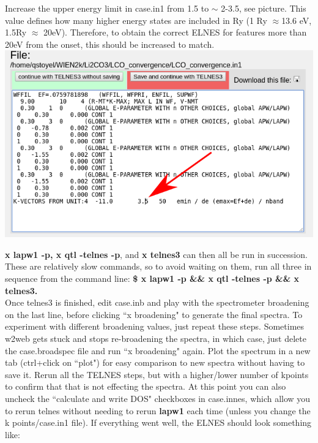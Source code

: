 \documentclass[12pt]{article}
\begin{document}
Increase the upper energy limit in case.in1 from 1.5 to $\sim$ 2-3.5, see picture.  This value defines how many higher energy states are included in Ry (1 Ry $\approx$13.6 eV, 1.5Ry $\approx$ 20eV). Therefore, to obtain the correct ELNES for features more than 20eV from the onset,  this should be increased to match.  \\

\includegraphics[scale=0.4]{./images/in1_edit.png}

\textbf{x lapw1 -p, x qtl -telnes -p}, and\textbf{ x telnes3} can then all be run in succession.  These are relatively slow commands, so to avoid waiting on them, run all three in sequence from the command line: \textbf{\$ x lapw1 -p \&\& x qtl -telnes -p \&\& x telnes3.}\\

Once telnes3 is finished, edit case.inb and play with the spectrometer broadening on the last line, before clicking ``x broadening" to generate the final spectra. To experiment with different broadening values, just repeat these steps.  Sometimes w2web gets stuck and stops re-broadening the spectra, in which case, just delete the case.broadspec file and run ``x broadening" again.   Plot the spectrum in a new tab (ctrl+click on ``plot") for easy comparison to new spectra without having to save it. Rerun all the TELNES steps, but with a higher/lower number of kpoints to confirm that that is not effecting the spectra. At this point you can also uncheck the ``calculate and write DOS" checkboxes in case.innes, which allow you to rerun telnes without needing to rerun\textbf{ lapw1} each time (unless you change the k points/case.in1 file).  If everything went well, the ELNES should look something like:   \\
\end{document}
